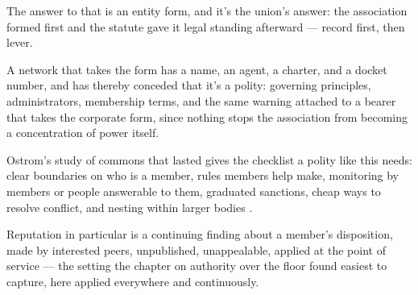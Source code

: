 The answer to that is an entity form, and it's the union's answer: the association formed first and the statute gave it legal standing afterward — record first, then lever.

A network that takes the form has a name, an agent, a charter, and a docket number, and has thereby conceded that it's a polity: governing principles, administrators, membership terms, and the same warning attached to a bearer that takes the corporate form, since nothing stops the association from becoming a concentration of power itself.

Ostrom's study of commons that lasted gives the checklist a polity like this needs: clear boundaries on who is a member, rules members help make, monitoring by members or people answerable to them, graduated sanctions, cheap ways to resolve conflict, and nesting within larger bodies \autocite{ostrom1990governing}.

Reputation in particular is a continuing finding about a member's disposition, made by interested peers, unpublished, unappealable, applied at the point of service — the setting the chapter on authority over the floor found easiest to capture, here applied everywhere and continuously.

